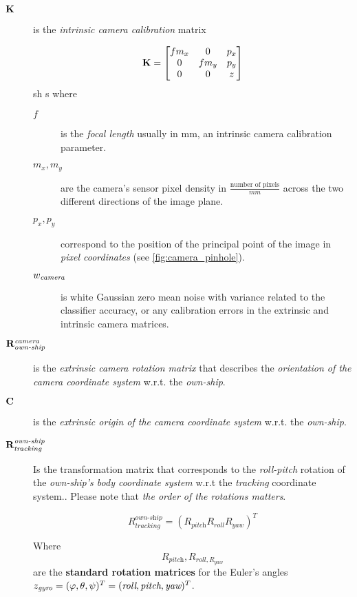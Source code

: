\begin{description}
\item[$\mathbf{K}$]
is the \emph{intrinsic camera calibration} matrix

$$\mathbf{K} = \begin{bmatrix}f m_x &0 &p_x \\
0 &f m_y &p_y \\
0 &0 &z
\end{bmatrix} $$
sh s
where

\begin{description}
	\item[$f$] is the \emph{focal length} usually in mm, an intrinsic camera calibration parameter.
	\item[$m_x, m_y$] are the camera's sensor pixel density in $\frac{\text{number of pixels}}{mm}$ across the two different directions of the image plane.
	\item[$p_x,p_y$] correspond to the position of the principal point of the image in \emph{pixel coordinates} (see \cref{fig:camera_pinhole}).
	\item[${w}_{\textit{camera}}$] is white Gaussian zero mean noise with variance related to the classifier accuracy, or any calibration errors in the extrinsic and intrinsic camera matrices.
	
\end{description}

\item[$\mathbf{R}_{\textit{own-ship}}^{\textit{camera}}$]
is the \emph{extrinsic camera rotation matrix }that describes the \emph{orientation of the camera coordinate system} w.r.t. the \emph{own-ship}.

\item[$\mathbf{C}$]
is the  \emph{extrinsic origin of the camera coordinate system} w.r.t. the \emph{own-ship}.


\item[$\mathbf{R}_{\textit{tracking}}^{\textit{own-ship}}$]
Is the transformation matrix that corresponds to the \emph{roll-pitch} rotation of the \emph{own-ship's body coordinate system} w.r.t the \emph{tracking} coordinate system.. Please note that \emph{the order of the rotations matters}.

\begin{equation}
R_{\textit{tracking}}^{\textit{own-ship}}=\left( R_{\textit{pitch}} R_{\textit{roll}}R_{\textit{yaw}}\right)^T
\end{equation}

Where $$R_{\textit{pitch}},R_{\textit{roll},R_{\textit{yaw}}}$$ are the \textbf{standard rotation matrices} \cite{LaVallea}for the Euler's angles $z_{\textit{gyro}}=({\varphi},{\theta},{\psi})^T = (\textit{roll},\textit{pitch},\textit{yaw})^T$.



\end{description}
